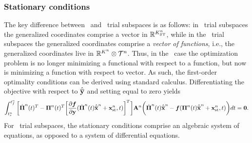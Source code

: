 \subsubsection{Stationary conditions} 
The key difference between \spaceTimeAcronym\ and \spatialAcronym\ trial subspaces is as follows: in \spaceTimeAcronym\ trial subspaces the generalized coordinates comprise a vector in $\mathbb{R}^{K_{\text{ST}}^{n}}$, while in the \spatialAcronym\ trial subspaces the generalized coordinates comprise a \textit{vector of functions}, i.e., the generalized coordinates live in $\mathbb{R}^{K^{n}} \otimes \mathcal{T}^{n}$. 
Thus, in the \spaceTimeAcronym\ case the optimization problem is no longer minimizing a functional with respect to a function, but now is minimizing a function with 
respect to vector.  As such, the first-order optimality conditions can be
	derived using standard calculus. Differentiating the objective with respect
	to $\hat{\mathbf{\overline{y}}}$ and setting equal to zero yields 
\begin{equation}\label{eq:st_stationary}
 \int_{t_s^{n}}^{t_f^{n}} \bigg[ \dot{\boldsymbol \Pi}^{n}(t)^T  - \boldsymbol \Pi^{n}(t)^T \bigg[\frac{\partial
\boldsymbol f}{\partial \mathbf{y}} (\dot{\boldsymbol \Pi}^{n}(t) \hat{\mathbf{\overline{x}}}^{n} +                    
\mathbf{x}_\text{st}^{n},t)\bigg]^T  \bigg] \mathbf{A}^{n} \bigg( \dot{\boldsymbol \Pi}^{n}(t) \hat{\mathbf{\overline{x}}}^{n}  - \boldsymbol f (\boldsymbol \Pi^{n}(t) \hat{\mathbf{\overline{x}}}^{n} + \mathbf{x}_\text{st}^{n},t) \bigg) dt = \boldsymbol 0.\end{equation}
For \spaceTimeAcronym\ trial subspaces, the stationary conditions comprise an algebraic system of equations, as opposed to a system of differential equations.

